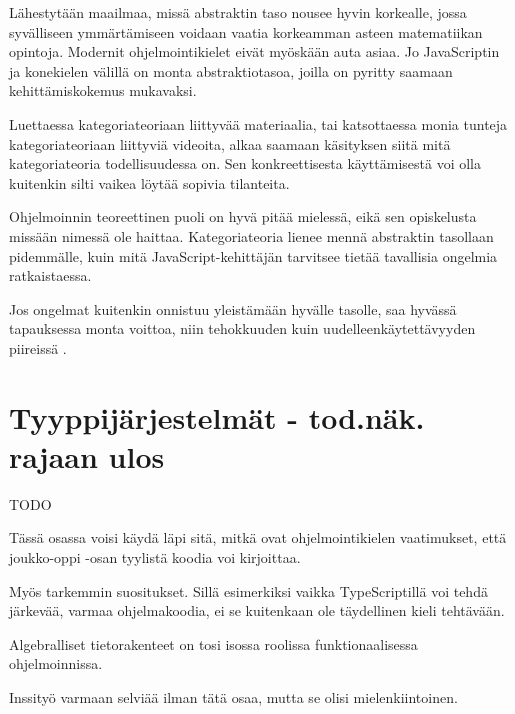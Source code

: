 Lähestytään maailmaa, missä abstraktin taso nousee hyvin korkealle, jossa syvälliseen ymmärtämiseen voidaan vaatia korkeamman asteen matematiikan opintoja. Modernit ohjelmointikielet eivät myöskään auta asiaa. Jo JavaScriptin ja konekielen välillä on monta abstraktiotasoa, joilla on pyritty saamaan kehittämiskokemus mukavaksi.

Luettaessa kategoriateoriaan liittyvää materiaalia, tai katsottaessa monia tunteja kategoriateoriaan liittyviä videoita, alkaa saamaan käsityksen siitä mitä kategoriateoria todellisuudessa on. Sen konkreettisesta käyttämisestä voi olla kuitenkin silti vaikea löytää sopivia tilanteita.

Ohjelmoinnin teoreettinen puoli on hyvä pitää mielessä, eikä sen opiskelusta missään nimessä ole haittaa. Kategoriateoria lienee mennä abstraktin tasollaan pidemmälle, kuin mitä JavaScript-kehittäjän tarvitsee tietää tavallisia ongelmia ratkaistaessa.

Jos ongelmat kuitenkin onnistuu yleistämään hyvälle tasolle, saa hyvässä tapauksessa monta voittoa, niin tehokkuuden kuin uudelleenkäytettävyyden piireissä \cite{clojure_compiler,bartosz_category_for_progamers,dijkstra_humble_programmer}.


\section{Tyyppijärjestelmät - tod.näk. rajaan ulos}

TODO

Tässä osassa voisi käydä läpi sitä, mitkä ovat ohjelmointikielen vaatimukset, että joukko-oppi -osan tyylistä koodia voi kirjoittaa.

Myös tarkemmin suositukset. Sillä esimerkiksi vaikka TypeScriptillä voi tehdä järkevää, varmaa ohjelmakoodia, ei se kuitenkaan ole täydellinen kieli tehtävään.

Algebralliset tietorakenteet on tosi isossa roolissa funktionaalisessa ohjelmoinnissa.

Inssityö varmaan selviää ilman tätä osaa, mutta se olisi mielenkiintoinen.



